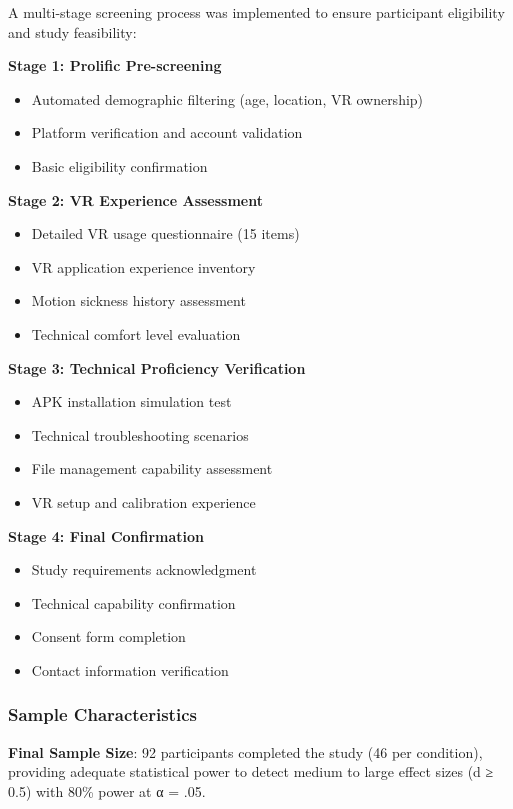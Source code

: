\documentclass[12pt]{article}
\begin{document}
A multi-stage screening process was implemented to ensure participant eligibility and study feasibility:

\textbf{Stage 1: Prolific Pre-screening}
\begin{itemize}
    \item Automated demographic filtering (age, location, VR ownership)
    \item Platform verification and account validation
    \item Basic eligibility confirmation
\end{itemize}

\textbf{Stage 2: VR Experience Assessment}
\begin{itemize}
    \item Detailed VR usage questionnaire (15 items)
    \item VR application experience inventory
    \item Motion sickness history assessment
    \item Technical comfort level evaluation
\end{itemize}

\textbf{Stage 3: Technical Proficiency Verification}
\begin{itemize}
    \item APK installation simulation test
    \item Technical troubleshooting scenarios
    \item File management capability assessment
    \item VR setup and calibration experience
\end{itemize}

\textbf{Stage 4: Final Confirmation}
\begin{itemize}
    \item Study requirements acknowledgment
    \item Technical capability confirmation
    \item Consent form completion
    \item Contact information verification
\end{itemize}

\subsubsection{Sample Characteristics}

\textbf{Final Sample Size}: 92 participants completed the study (46 per condition), providing adequate statistical power to detect medium to large effect sizes (d ≥ 0.5) with 80\% power at α = .05.
\end{document}

